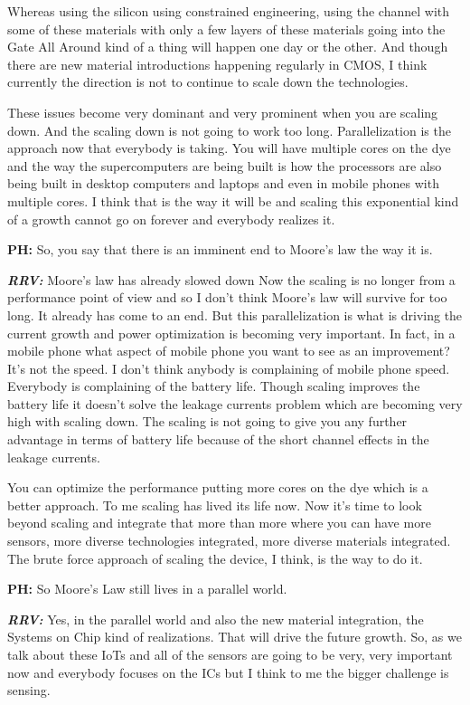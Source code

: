 \begin{multicols}{2}
Whereas using the silicon using constrained engineering, using the channel with some of these materials with only a few layers of these materials going into the Gate All Around kind of a thing will happen one day or the other. And though there are new material introductions happening regularly in CMOS, I think currently the direction is not to continue to scale down the technologies.

These issues become very dominant and very prominent when you are scaling down. And the scaling down is not going to work too long. Parallelization is the approach now that everybody is taking. You will have multiple cores on the dye and the way the supercomputers are being built is how the processors are also being built in desktop computers and laptops and even in mobile phones with multiple cores. I think that is the way it will be and scaling this exponential kind of a growth cannot go on forever and everybody realizes it.

\textbf{PH:}  So, you say that there is an imminent end to Moore’s law the way it is.

\textbf{\textit{RRV:}} Moore’s law has already slowed down Now the scaling is no longer from a performance point of view and so I don’t think Moore’s law will survive for too long. It already has come to an end. But this parallelization is what is driving the current growth and power optimization is becoming very important. In fact, in a mobile phone what aspect of mobile phone you want to see as an improvement? It’s not the speed. I don’t think anybody is complaining of mobile phone speed. Everybody is complaining of the battery life. Though scaling improves the battery life it doesn’t solve the leakage currents problem which are becoming very high with scaling down. The scaling is not going to give you any further advantage in terms of battery life because of the short channel effects in the leakage currents. 

You can optimize the performance putting more cores on the dye which is a better approach. To me scaling has lived its life now. Now it’s time to look beyond scaling and integrate that more than more where you can have more sensors, more diverse technologies integrated, more diverse materials integrated. The brute force approach of scaling the device, I think, is the way to do it.

\textbf{PH:} So Moore’s Law still lives in a parallel world. 

\textbf{\textit{RRV:}} Yes, in the parallel world and also the new material integration, the Systems on Chip kind of realizations. That will drive the future growth. So, as we talk about these IoTs and all of the sensors are going to be very, very important now and everybody focuses on the ICs but I think to me the bigger challenge is sensing.


\end{multicols}
